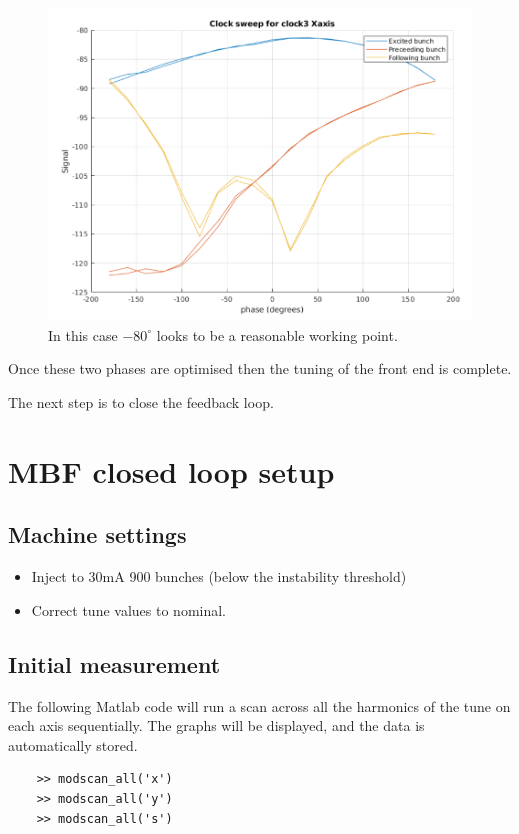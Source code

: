 \documentclass{report}
\begin{document}
\begin{figure}[h]
    \centering
    \includegraphics[width=0.8\linewidth]{clock_sweep.png}
    \caption{In this case $-80^\circ$ looks to be a reasonable working point. }
    \label{fig:frontend_clock_phase_scan}
\end{figure}
  
Once these two phases are optimised then the tuning of the front end is complete.

The next step is to close the feedback loop.
\clearpage
\section{MBF closed loop setup}

\subsection{Machine settings}
\begin{itemize}
    \item {Inject to 30mA 900 bunches (below the instability threshold)}
    \item{Correct tune values to nominal.}
\end{itemize}

\subsection{Initial measurement}
The following Matlab code will run a scan across all the harmonics of the tune on each axis sequentially. The graphs will be displayed, and the data is automatically stored.
\begin{verbatim}
    >> modscan_all('x') 
    >> modscan_all('y') 
    >> modscan_all('s') 
\end{verbatim}
\clearpage
\end{document}
